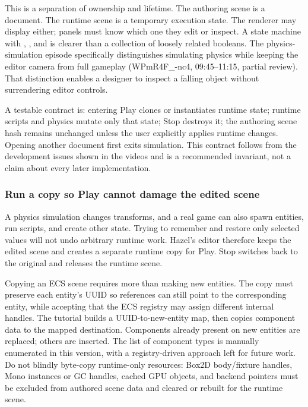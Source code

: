 This is a separation of ownership and lifetime. The authoring scene is a document. The runtime scene is a temporary execution state. The renderer may display either; panels must know which one they edit or inspect. A state machine with , , and  is clearer than a collection of loosely related booleans. The physics-simulation episode specifically distinguishes simulating physics while keeping the editor camera from full gameplay (WPmR4F\_-nc4, 09:45--11:15, partial review). That distinction enables a designer to inspect a falling object without surrendering editor controls.

A testable contract is: entering Play clones or instantiates runtime state; runtime scripts and physics mutate only that state; Stop destroys it; the authoring scene hash remains unchanged unless the user explicitly applies runtime changes. Opening another document first exits simulation. This contract follows from the development issues shown in the videos and is a recommended invariant, not a claim about every later implementation.

\subsubsection{Run a copy so Play cannot damage the edited scene}\label{06-engine-ii-ch033-run-a-copy-so-play-cannot-damage-the-edited-scene}

\hypertarget{06-engine-ii-ch033-run-a-copy-so-play-cannot-damage-the-edited-scene}{}

A physics simulation changes transforms, and a real game can also spawn entities, run scripts, and create other state. Trying to remember and restore only selected values will not undo arbitrary runtime work. Hazel's editor therefore keeps the edited scene and creates a separate runtime copy for Play. Stop switches back to the original and releases the runtime scene.

Copying an ECS scene requires more than making new entities. The copy must preserve each entity's UUID so references can still point to the corresponding entity, while accepting that the ECS registry may assign different internal handles. The tutorial builds a UUID-to-new-entity map, then copies component data to the mapped destination. Components already present on new entities are replaced; others are inserted. The list of component types is manually enumerated in this version, with a registry-driven approach left for future work. Do not blindly byte-copy runtime-only resources: Box2D body/fixture handles, Mono instances or GC handles, cached GPU objects, and backend pointers must be excluded from authored scene data and cleared or rebuilt for the runtime scene.

